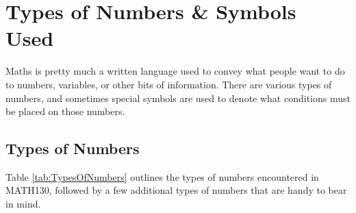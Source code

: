 \chapter{Types of Numbers \& Symbols Used}
\label{chap:TypesOfNumbersAndSymbolsUsed}
Maths is pretty much a written language used to convey what people want to do
to numbers, variables, or other bits of information. There are various types
of numbers, and sometimes special symbols are used to denote what conditions
must be placed on those numbers.
\section{Types of Numbers}
\label{sec:TypesOfNumbersUsed}
Table \ref{tab:TypesOfNumbers} outlines the types of numbers encountered in
MATH130, followed by a few additional types of numbers that are handy to bear
in mind.
